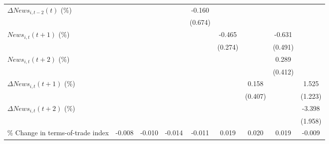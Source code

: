 {\begin{tabular}{l*{8}{c}}
\addlinespace
$ \Delta News_{i,t-2}(t)$ (\%)&                     &                     &                     &      -0.160         &                     &                     &                     &                     \\
                    &                     &                     &                     &     (0.674)         &                     &                     &                     &                     \\
\addlinespace
$ News_{i,t}(t+1)$ (\%)&                     &                     &                     &                     &      -0.465\sym{*}  &                     &      -0.631         &                     \\
                    &                     &                     &                     &                     &     (0.274)         &                     &     (0.491)         &                     \\
\addlinespace
$ News_{i,t}(t+2)$ (\%)&                     &                     &                     &                     &                     &                     &       0.289         &                     \\
                    &                     &                     &                     &                     &                     &                     &     (0.412)         &                     \\
\addlinespace
$ \Delta News_{i,t}(t+1)$ (\%)&                     &                     &                     &                     &                     &       0.158         &                     &       1.525         \\
                    &                     &                     &                     &                     &                     &     (0.407)         &                     &     (1.223)         \\
\addlinespace
$ \Delta News_{i,t}(t+2)$ (\%)&                     &                     &                     &                     &                     &                     &                     &      -3.398\sym{*}  \\
                    &                     &                     &                     &                     &                     &                     &                     &     (1.958)         \\
\addlinespace
\% Change in terms-of-trade index&      -0.008         &      -0.010         &      -0.014         &      -0.011         &       0.019         &       0.020         &       0.019         &      -0.009         \\

\end{tabular}}
